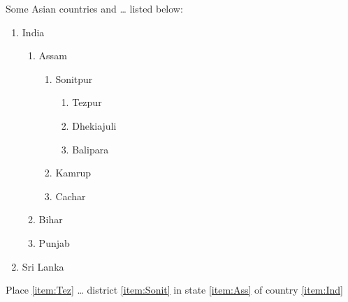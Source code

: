\documentclass[11pt,a4paper]{article}
\begin{document}
    Some Asian countries and … listed below:
    \begin{enumerate}
        \item India\label{item:Ind}
        \begin{enumerate}
            \item Assam\label{item:Ass}
            \begin{enumerate}
                \item Sonitpur\label{item:Sonit}
                \begin{enumerate}
                    \item Tezpur\label{item:Tez}
                    \item Dhekiajuli
                    \item Balipara
                \end{enumerate}
                \item Kamrup
                \item Cachar
            \end{enumerate}
            \item Bihar
            \item Punjab
        \end{enumerate}
        \item Sri Lanka
    \end{enumerate}
    Place \ref{item:Tez} … district \ref{item:Sonit} in
    state \ref{item:Ass} of country \ref{item:Ind}
\end{document}
